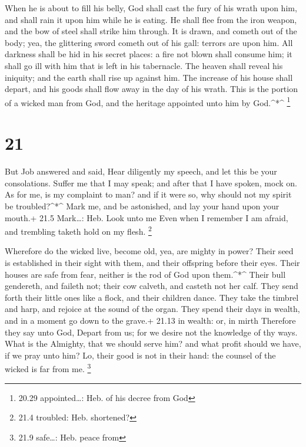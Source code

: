  When he is about to fill his belly, God shall cast the
fury of his wrath upon him, and shall rain it upon him while he is
eating.  He shall flee from the iron weapon, and the bow of
steel shall strike him through.  It is drawn, and cometh
out of the body; yea, the glittering sword cometh out of his gall:
terrors are upon him.  All darkness shall be hid in his
secret places: a fire not blown shall consume him; it shall go ill with
him that is left in his tabernacle.  The heaven shall
reveal his iniquity; and the earth shall rise up against him.
 The increase of his house shall depart, and his goods
shall flow away in the day of his wrath.  This is the
portion of a wicked man from God, and the heritage appointed unto him by
God.\^{}*\^{} \footnote{20.29 appointed\ldots: Heb. of his decree from
  God}

\hypertarget{section-20}{%
\section{21}\label{section-20}}

 But Job answered and said,  Hear diligently my
speech, and let this be your consolations.  Suffer me that I
may speak; and after that I have spoken, mock on.  As for
me, is my complaint to man? and if it were so, why should not my spirit
be troubled?\^{}*\^{}  Mark me, and be astonished, and lay
your hand upon your mouth.+ 21.5 Mark\ldots: Heb. Look unto me
 Even when I remember I am afraid, and trembling taketh hold
on my flesh. \footnote{21.4 troubled: Heb. shortened?}

 Wherefore do the wicked live, become old, yea, are mighty
in power?  Their seed is established in their sight with
them, and their offspring before their eyes.  Their houses
are safe from fear, neither is the rod of God upon them.\^{}*\^{}
 Their bull gendereth, and faileth not; their cow calveth,
and casteth not her calf.  They send forth their little
ones like a flock, and their children dance.  They take the
timbrel and harp, and rejoice at the sound of the organ. 
They spend their days in wealth, and in a moment go down to the grave.+
21.13 in wealth: or, in mirth  Therefore they say unto God,
Depart from us; for we desire not the knowledge of thy ways.
 What is the Almighty, that we should serve him? and what
profit should we have, if we pray unto him?  Lo, their good
is not in their hand: the counsel of the wicked is far from me.
\footnote{21.9 safe\ldots: Heb. peace from}

